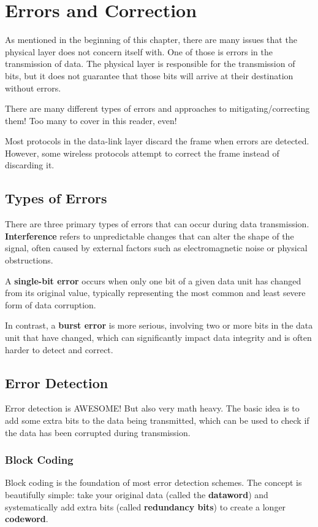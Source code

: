 \section{Errors and Correction}
\label{sec:error_detection}
As mentioned in the beginning of this chapter, there are many issues that the physical layer does not concern itself with. One of those is errors in the transmission of data. The physical layer is responsible for the transmission of bits, but it does not guarantee that those bits will arrive at their destination without errors.

There are many different types of errors and approaches to mitigating/correcting them! Too many to cover in this reader, even!

Most protocols in the data-link layer discard the frame when errors are detected. However, some wireless protocols attempt to correct the frame instead of discarding it.

\subsection{Types of Errors}
There are three primary types of errors that can occur during data transmission. \textbf{Interference} refers to unpredictable changes that can alter the shape of the signal, often caused by external factors such as electromagnetic noise or physical obstructions. 

A \textbf{single-bit error} occurs when only one bit of a given data unit has changed from its original value, typically representing the most common and least severe form of data corruption. 

In contrast, a \textbf{burst error} is more serious, involving two or more bits in the data unit that have changed, which can significantly impact data integrity and is often harder to detect and correct.

\subsection{Error Detection}
Error detection is AWESOME! But also very math heavy. The basic idea is to add some extra bits to the data being transmitted, which can be used to check if the data has been corrupted during transmission.

\subsubsection{Block Coding}
Block coding is the foundation of most error detection schemes. The concept is beautifully simple: take your original data (called the \textbf{dataword}) and systematically add extra bits (called \textbf{redundancy bits}) to create a longer \textbf{codeword}.

